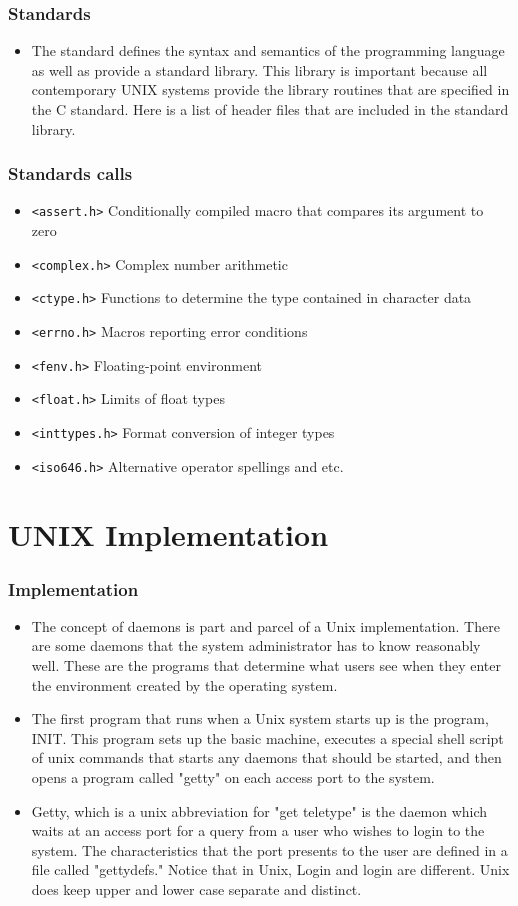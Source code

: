 \documentclass[newPxFont,sthlmFooter,nooffset]{beamer}
\begin{document}
\begin{frame}[t]
	\frametitle{Standards}
	\begin{itemize}
		\item The standard defines the syntax and semantics of the programming language as well as provide a standard library. This library is important because all contemporary UNIX systems provide the library routines that are specified in the C standard. Here is a list of header files that are included in the standard library.
	\end{itemize}
\end{frame}

\begin{frame}[t]
  \frametitle{Standards calls}
  \begin{itemize}
  \item \texttt{<assert.h>} Conditionally compiled macro that compares its argument to zero
\item \texttt{<complex.h>} Complex number arithmetic
\item \texttt{<ctype.h>} Functions to determine the type contained in character data
\item \texttt{<errno.h>} Macros reporting error conditions
\item \texttt{<fenv.h>} Floating-point environment
\item \texttt{<float.h>} Limits of float types
\item \texttt{<inttypes.h>} Format conversion of integer types
\item \texttt{<iso646.h>} Alternative operator spellings and etc.
  \end{itemize}
\end{frame}

\section{UNIX Implementation}
	\begin{frame}[t]
		\frametitle{Implementation}
		\begin{itemize}
\item The concept of daemons is part and parcel of a Unix implementation. There are some daemons that the system administrator has to know reasonably well. These are the programs that determine what users see when they enter the environment created by the operating system.

\item The first program that runs when a Unix system starts up is the program, INIT. This program sets up the basic machine, executes a special shell script of unix commands that starts any daemons that should be started, and then opens a program called "getty" on each access port to the system.

\item Getty, which is a unix abbreviation for "get teletype" is the daemon which waits at an access port for a query from a user who wishes to login to the system. The characteristics that the port presents to the user are defined in a file called "gettydefs." Notice that in Unix, Login and login are different. Unix does keep upper and lower case separate and distinct.
		\end{itemize}
	\end{frame}
\end{document}

